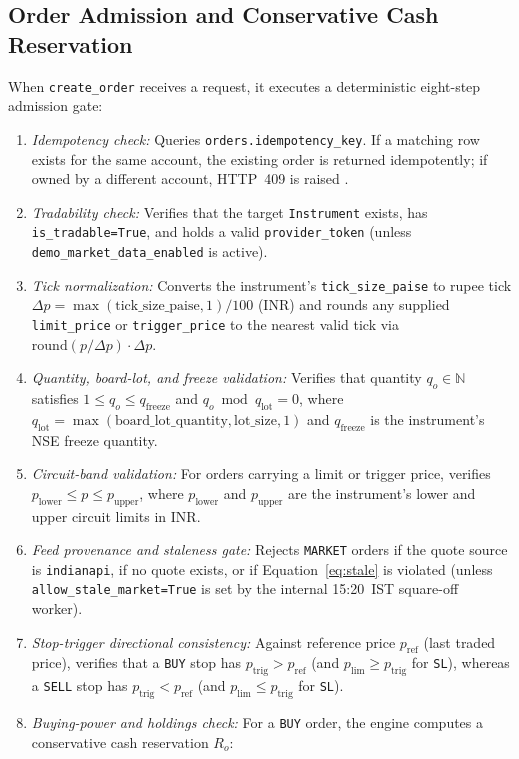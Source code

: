 \documentclass[journal,onecolumn,10pt]{IEEEtran}
\begin{document}
\subsection{Order Admission and Conservative Cash Reservation}
When \texttt{create\_order} receives a request, it executes a deterministic eight-step admission gate:
\begin{enumerate}
  \item \emph{Idempotency check:} Queries \texttt{orders.idempotency\_key}. If a matching row exists for the same account, the existing order is returned idempotently; if owned by a different account, HTTP~409 is raised \cite{helland2012}.
  \item \emph{Tradability check:} Verifies that the target \texttt{Instrument} exists, has \texttt{is\_tradable=True}, and holds a valid \texttt{provider\_token} (unless \texttt{demo\_market\_data\_enabled} is active).
  \item \emph{Tick normalization:} Converts the instrument's \texttt{tick\_size\_paise} to rupee tick $\Delta p = \max(\text{tick\_size\_paise}, 1)/100$ (INR) and rounds any supplied \texttt{limit\_price} or \texttt{trigger\_price} to the nearest valid tick via $\mathrm{round}(p/\Delta p)\cdot \Delta p$.
  \item \emph{Quantity, board-lot, and freeze validation:} Verifies that quantity $q_o \in \mathbb{N}$ satisfies $1 \le q_o \le q_{\mathrm{freeze}}$ and $q_o \bmod q_{\mathrm{lot}} = 0$, where $q_{\mathrm{lot}} = \max(\text{board\_lot\_quantity}, \text{lot\_size}, 1)$ and $q_{\mathrm{freeze}}$ is the instrument's NSE freeze quantity.
  \item \emph{Circuit-band validation:} For orders carrying a limit or trigger price, verifies $p_{\mathrm{lower}} \le p \le p_{\mathrm{upper}}$, where $p_{\mathrm{lower}}$ and $p_{\mathrm{upper}}$ are the instrument's lower and upper circuit limits in INR.
  \item \emph{Feed provenance and staleness gate:} Rejects \texttt{MARKET} orders if the quote source is \texttt{indianapi}, if no quote exists, or if Equation~\eqref{eq:stale} is violated (unless \texttt{allow\_stale\_market=True} is set by the internal 15:20~IST square-off worker).
  \item \emph{Stop-trigger directional consistency:} Against reference price $p_{\mathrm{ref}}$ (last traded price), verifies that a \texttt{BUY} stop has $p_{\mathrm{trig}} > p_{\mathrm{ref}}$ (and $p_{\mathrm{lim}} \ge p_{\mathrm{trig}}$ for \texttt{SL}), whereas a \texttt{SELL} stop has $p_{\mathrm{trig}} < p_{\mathrm{ref}}$ (and $p_{\mathrm{lim}} \le p_{\mathrm{trig}}$ for \texttt{SL}).
  \item \emph{Buying-power and holdings check:} For a \texttt{BUY} order, the engine computes a conservative cash reservation $R_o$:
\end{enumerate}
\end{document}
